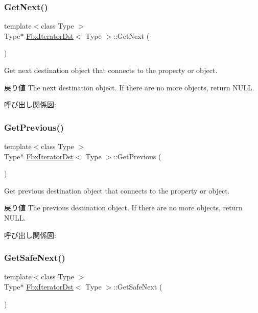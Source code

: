 \subsubsection{\texorpdfstring{Get\+Next()}{GetNext()}}
{\footnotesize\ttfamily template$<$class Type $>$ \\
Type$\ast$ \hyperlink{class_fbx_iterator_dst}{Fbx\+Iterator\+Dst}$<$ Type $>$\+::Get\+Next (\begin{DoxyParamCaption}{ }\end{DoxyParamCaption})}

Get next destination object that connects to the property or object. \begin{DoxyReturn}{戻り値}
The next destination object. If there are no more objects, return N\+U\+LL. 
\end{DoxyReturn}
呼び出し関係図\+:
\mbox{\label{class_fbx_iterator_dst_a6548b31d47373fcebc51541b190d133c}} 
\subsubsection{\texorpdfstring{Get\+Previous()}{GetPrevious()}}
{\footnotesize\ttfamily template$<$class Type $>$ \\
Type$\ast$ \hyperlink{class_fbx_iterator_dst}{Fbx\+Iterator\+Dst}$<$ Type $>$\+::Get\+Previous (\begin{DoxyParamCaption}{ }\end{DoxyParamCaption})}

Get previous destination object that connects to the property or object. \begin{DoxyReturn}{戻り値}
The previous destination object. If there are no more objects, return N\+U\+LL. 
\end{DoxyReturn}
呼び出し関係図\+:
\mbox{\label{class_fbx_iterator_dst_a0db8152df8a6c4be6b35e66b6d666b24}} 
\subsubsection{\texorpdfstring{Get\+Safe\+Next()}{GetSafeNext()}}
{\footnotesize\ttfamily template$<$class Type $>$ \\
Type$\ast$ \hyperlink{class_fbx_iterator_dst}{Fbx\+Iterator\+Dst}$<$ Type $>$\+::Get\+Safe\+Next (\begin{DoxyParamCaption}{ }\end{DoxyParamCaption})}


